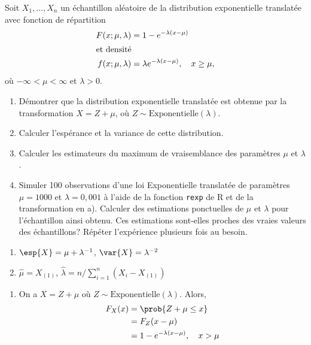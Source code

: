 \begin{exercice}
  \label{ex:ponctuelle:expon}
  Soit $X_1, \dots, X_n$ un échantillon aléatoire de la distribution
  exponentielle translatée avec fonction de répartition
  \begin{align*}
    F(x; \mu, \lambda)
    &= 1 - e^{-\lambda (x - \mu)} \\
    \intertext{et densité}
    f(x; \mu, \lambda)
    &= \lambda e^{-\lambda (x - \mu)}, \quad x \geq \mu,
  \end{align*}
  où $-\infty < \mu < \infty$ et $\lambda > 0$.
  \begin{enumerate}
  \item Démontrer que la distribution exponentielle translatée est
    obtenue par la transformation $X = Z + \mu$, où $Z \sim
    \text{Exponentielle}(\lambda)$.
  \item Calculer l'espérance et la variance de cette distribution.
  \item Calculer les estimateurs du maximum de vraisemblance des
    paramètres $\mu$ et $\lambda$.
  \item Simuler 100 observations d'une loi Exponentielle translatée de
    paramètres $\mu = 1000$ et $\lambda = 0,001$ à l'aide de la
    fonction \texttt{rexp} de \textsf{R} et de la transformation en
    a). Calculer des estimations ponctuelles de $\mu$ et $\lambda$
    pour l'échantillon ainsi obtenu. Ces estimations sont-elles
    proches des vraies valeurs des échantillons? Répéter l'expérience
    plusieurs fois au besoin.
  \end{enumerate}
  \begin{rep}
    \begin{enumerate}
    \item $\esp{X} = \mu + \lambda^{-1}$, $\var{X} = \lambda^{-2}$
    \item $\hat{\mu} = X_{(1)}$, $\hat{\lambda} = n/\sum_{i = 1}^n (X_i -
        X_{(1)})$
    \end{enumerate}
  \end{rep}
  \begin{sol}
    \begin{enumerate}
    \item On a $X = Z + \mu$ où $Z \sim
      \text{Exponentielle}(\lambda)$. Alors,
      \begin{align*}
        F_X(x) &= \prob{Z + \mu \leq x}\\
        &= F_Z(x - \mu) \\
        &= 1 - e^{-\lambda (x-\mu)}, \quad x > \mu \\

\end{align*}
\end{enumerate}
\end{sol}
\end{exercice}
